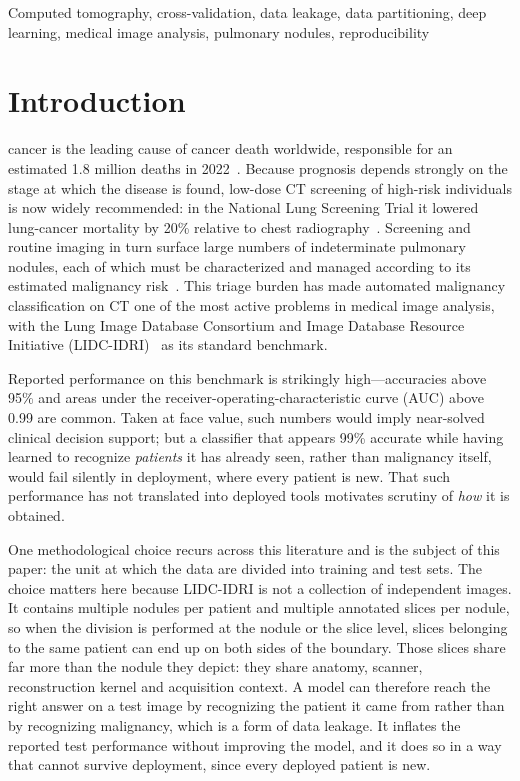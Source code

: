 \documentclass{ieeeaccess}
\newcommand{\vcite}[1]{\cite{#1}}
\begin{document}
\begin{keywords}
Computed tomography, cross-validation, data leakage, data partitioning, deep learning, medical image
analysis, pulmonary nodules, reproducibility
\end{keywords}

\titlepgskip=-21pt

\maketitle

\section{Introduction}
 cancer is the leading cause of cancer death worldwide, responsible for an estimated
1.8 million deaths in 2022~\vcite{bray2024}. Because prognosis depends strongly on the stage at
which the disease is found, low-dose CT screening of high-risk individuals is now widely
recommended: in the National Lung Screening Trial it lowered lung-cancer mortality by 20\% relative
to chest radiography~\vcite{aberle2011}. Screening and routine imaging in turn surface large numbers
of indeterminate pulmonary nodules, each of which must be characterized and managed according to its
estimated malignancy risk~\vcite{macmahon2017}. This triage burden has made automated malignancy
classification on CT one of the most active problems in medical image analysis, with the Lung Image
Database Consortium and Image Database Resource Initiative (LIDC-IDRI)~\vcite{armato2011} as its
standard benchmark.

Reported performance on this benchmark is strikingly high---accuracies above 95\% and areas under
the receiver-operating-characteristic curve (AUC) above 0.99 are common. Taken at face value, such
numbers would imply near-solved clinical decision support; but a classifier that appears 99\%
accurate while having learned to recognize \emph{patients} it has already seen, rather than
malignancy itself, would fail silently in deployment, where every patient is new. That such
performance has not translated into deployed tools motivates scrutiny of \emph{how} it is obtained.

One methodological choice recurs across this literature and is the subject of this paper: the unit
at which the data are divided into training and test sets. The choice matters here because
LIDC-IDRI is not a collection of independent images. It contains multiple nodules per patient and
multiple annotated slices per nodule, so when the division is performed at the nodule or the slice
level, slices belonging to the same patient can end up on both sides of the boundary. Those slices
share far more than the nodule they depict: they share anatomy, scanner, reconstruction kernel and
acquisition context. A model can therefore reach the right answer on a test image by recognizing the
patient it came from rather than by recognizing malignancy, which is a form of data leakage. It
inflates the reported test performance without improving the model, and it does so in a way that
cannot survive deployment, since every deployed patient is new.
\end{document}
